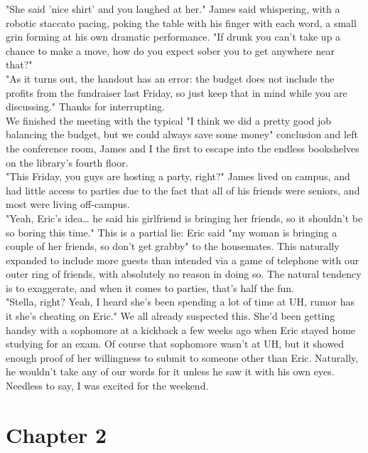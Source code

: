 \documentclass[11pt]{article}
\begin{document}
"She said 'nice shirt' and you laughed at her." James said whispering, with a robotic staccato pacing, poking the table with his finger with each word, a small grin forming at his own dramatic performance. "If drunk you can't take up a chance to make a move, how do you expect sober you to get anywhere near that?" \\
"As it turns out, the handout has an error: the budget does not include the profits from the fundraiser last Friday, so just keep that in mind while you are discussing." Thanks for interrupting. \\
We finished the meeting with the typical "I think we did a pretty good job balancing the budget, but we could always save some money" conclusion and left the conference room, James and I the first to escape into the endless bookshelves on the library's fourth floor. \\
"This Friday, you guys are hosting a party, right?" James lived on campus, and had little access to parties due to the fact that all of his friends were seniors, and most were living off-campus. \\
"Yeah, Eric's idea\ldots{} he said his girlfriend is bringing her friends, so it shouldn't be so boring this time." This is a partial lie: Eric said "my woman is bringing a couple of her friends, so don't get grabby" to the housemates. This naturally expanded to include more guests than intended via a game of telephone with our outer ring of friends, with absolutely no reason in doing so. The natural tendency is to exaggerate, and when it comes to parties, that's half the fun. \\
"Stella, right? Yeah, I heard she's been spending a lot of time at UH, rumor has it she's cheating on Eric." We all already suspected this. She'd been getting handsy with a sophomore at a kickback a few weeks ago when Eric stayed home studying for an exam. Of course that sophomore wasn't at UH, but it showed enough proof of her willingness to submit to someone other than Eric. Naturally, he wouldn't take any of our words for it unless he saw it with his own eyes. \\
Needless to say, I was excited for the weekend. \\
\section*{Chapter 2}
\label{sec:orgb5bbd27}
\end{document}
